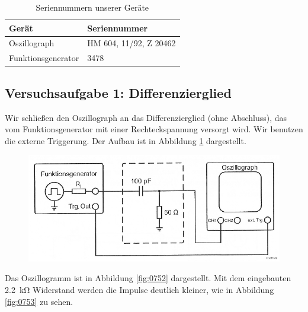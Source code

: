 \begin{table}[hb]
	\center
	\begin{tabular}{ll}
		Gerät & Seriennummer \\
		\hline
		Oszillograph & HM 604, 11/92, Z 20462 \\
		Funktionsgenerator & 3478 \\
	\end{tabular}
	\caption{Seriennummern unserer Geräte}
	\label{tb:seriennummern}
\end{table}

\FloatBarrier
\subsection{Versuchsaufgabe 1: Differenzierglied}

Wir schließen den Oszillograph an das Differenzierglied (ohne Abschluss), das
vom Funktionsgenerator mit einer Rechteckspannung versorgt wird. Wir benutzen
die externe Triggerung. Der Aufbau ist in Abbildung \ref{fig:1-6} dargestellt.

\begin{figure}
	\centering
	\includegraphics[width=\textwidth]{Schaltplan/1-6.png}
	\caption{%
		\cite[Abbildung~1.6]{physik313-Anleitung}
	}
	\label{fig:1-6}
\end{figure}

Das
Oszillogramm ist in Abbildung \ref{fig:0752} dargestellt. Mit dem eingebauten
\SI{2.2}{\kilo\ohm} Widerstand werden die Impulse deutlich kleiner, wie in
Abbildung \ref{fig:0753} zu sehen.


